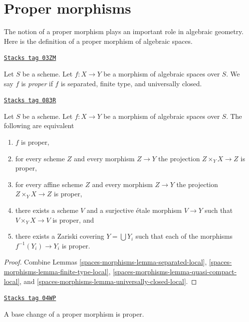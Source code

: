 \section{Proper morphisms}
\label{spaces-morphisms-section-proper}
The notion of a proper morphism plays an important role in algebraic geometry.
Here is the definition of a proper morphism of algebraic spaces.

\begin{definition}[Proper]
\label{spaces-morphisms-definition-proper}
\href{https://stacks.math.columbia.edu/tag/03ZM}{\texttt{Stacks tag 03ZM}}

Let $S$ be a scheme.
Let $f : X \to Y$ be a morphism of algebraic spaces over $S$.
We say $f$ is {\it proper} if $f$ is separated, finite type, and
universally closed.
\end{definition}

\begin{lemma}
\label{spaces-morphisms-lemma-proper-local}
\href{https://stacks.math.columbia.edu/tag/083R}{\texttt{Stacks tag 083R}}

Let $S$ be a scheme. Let $f : X \to Y$ be a morphism of algebraic spaces
over $S$. The following are equivalent
\begin{enumerate}
\item $f$ is proper,
\item for every scheme $Z$ and every morphism $Z \to Y$
the projection $Z \times_Y X \to Z$ is proper,
\item for every affine scheme $Z$ and every morphism $Z \to Y$
the projection $Z \times_Y X \to Z$ is proper,
\item there exists a scheme $V$ and a surjective \'etale morphism
$V \to Y$ such that $V \times_Y X \to V$ is proper, and
\item there exists a Zariski covering $Y = \bigcup Y_i$ such that
each of the morphisms $f^{-1}(Y_i) \to Y_i$ is proper.
\end{enumerate}
\end{lemma}

\begin{proof}
Combine Lemmas \ref{spaces-morphisms-lemma-separated-local},
\ref{spaces-morphisms-lemma-finite-type-local},
\ref{spaces-morphisms-lemma-quasi-compact-local}, and
\ref{spaces-morphisms-lemma-universally-closed-local}.
\end{proof}

\begin{lemma}
\label{spaces-morphisms-lemma-base-change-proper}
\href{https://stacks.math.columbia.edu/tag/04WP}{\texttt{Stacks tag 04WP}}

A base change of a proper morphism is proper.
\end{lemma}

